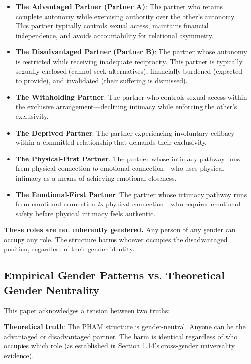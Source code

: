 \documentclass[12pt,openany]{book}
\numberwithin{equation}{chapter}
\begin{document}
\begin{itemize}
    \item \textbf{The Advantaged Partner (Partner A)}: The partner who retains complete autonomy while exercising authority over the other's autonomy. This partner typically controls sexual access, maintains financial independence, and avoids accountability for relational asymmetry.
    
    \item \textbf{The Disadvantaged Partner (Partner B)}: The partner whose autonomy is restricted while receiving inadequate reciprocity. This partner is typically sexually enclosed (cannot seek alternatives), financially burdened (expected to provide), and invalidated (their suffering is dismissed).
    
    \item \textbf{The Withholding Partner}: The partner who controls sexual access within the exclusive arrangement---declining intimacy while enforcing the other's exclusivity.
    
    \item \textbf{The Deprived Partner}: The partner experiencing involuntary celibacy within a committed relationship that demands their exclusivity.
    
    \item \textbf{The Physical-First Partner}: The partner whose intimacy pathway runs from physical connection \textit{to} emotional connection---who uses physical intimacy as a means of achieving emotional closeness.
    
    \item \textbf{The Emotional-First Partner}: The partner whose intimacy pathway runs from emotional connection \textit{to} physical connection---who requires emotional safety before physical intimacy feels authentic.
\end{itemize}

\textbf{These roles are not inherently gendered.} Any person of any gender can occupy any role. The structure harms whoever occupies the disadvantaged position, regardless of their gender identity.

\subsection{Empirical Gender Patterns vs. Theoretical Gender Neutrality}

This paper acknowledges a tension between two truths:

\textbf{Theoretical truth}: The PHAM structure is gender-neutral. Anyone can be the advantaged or disadvantaged partner. The harm is identical regardless of who occupies which role (as established in Section 1.14's cross-gender universality evidence).
\end{document}
